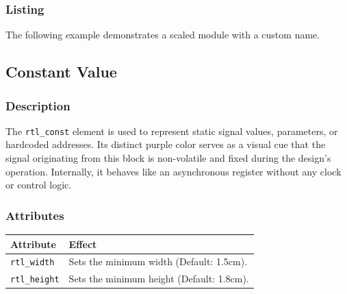     \subsubsection{\sffamily Listing}
        The following example demonstrates a scaled module with a custom name.

\begin{RTLexample}
\end{RTLexample}

\subsection{\sffamily Constant Value}

    \subsubsection{\sffamily Description}
        The \texttt{rtl\_const} element is used to represent static signal values, parameters, or hardcoded addresses. Its distinct purple color serves as a visual cue that the signal originating from this block is non-volatile and fixed during the design's operation. 
        Internally, it behaves like an asynchronous register without any clock or control logic.

    \subsubsection{\sffamily Attributes}
    \begin{center}
        \begin{tabular}{lp{8cm}}
        \toprule
            \textbf{Attribute} & \textbf{Effect} \\
            \midrule
            \texttt{rtl\_width} & Sets the minimum width (Default: 1.5cm). \\
            \texttt{rtl\_height} & Sets the minimum height (Default: 1.8cm). \\
            \bottomrule
        \end{tabular}
    \end{center}

